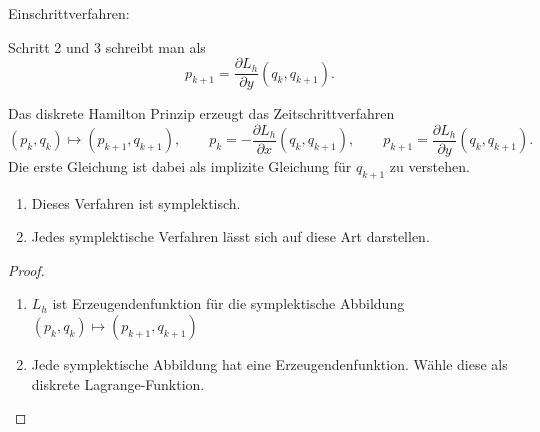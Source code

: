 \documentclass[german]{scrreprt}
\theoremstyle{plain}
\theoremstyle{nonumberplain}
\theoremstyle{nonumberplain}
\theoremstyle{nonumberplain}
\newtheorem{proof}{Beweis}
\begin{document}
Einschrittverfahren:
\begin{center}
\end{center}
Schritt 2 und 3 schreibt man als
\begin{equation*}
p_{k+1} = \frac{\partial L_h}{\partial y} (q_k, q_{k+1}).
\end{equation*}

\begin{satz}
	Das diskrete Hamilton Prinzip erzeugt das Zeitschrittverfahren
	\begin{equation*}
	(p_k, q_k) \mapsto (p_{k+1}, q_{k+1}),
	\qquad
	p_k = - \frac{\partial L_h}{\partial x} (q_k, q_{k+1}),
	\qquad
	p_{k+1}  = \frac{\partial L_h}{\partial y} (q_k, q_{k+1}).
	\end{equation*}
	Die erste Gleichung ist dabei als implizite Gleichung für $q_{k+1}$ zu verstehen.
	\begin{enumerate}[label=(\roman*)]
		\item Dieses Verfahren ist symplektisch.
		\item Jedes symplektische Verfahren lässt sich auf diese Art darstellen.
	\end{enumerate}
\end{satz}
\begin{proof}\mbox{} %
	\begin{enumerate}[label=(\roman*)]
		\item $L_h$ ist Erzeugendenfunktion für die symplektische Abbildung $(p_k, q_k) \mapsto (p_{k+1}, q_{k+1})$
		\item Jede symplektische Abbildung hat eine Erzeugendenfunktion. Wähle diese als diskrete Lagrange-Funktion.
	\end{enumerate}
\end{proof}
\end{document}
